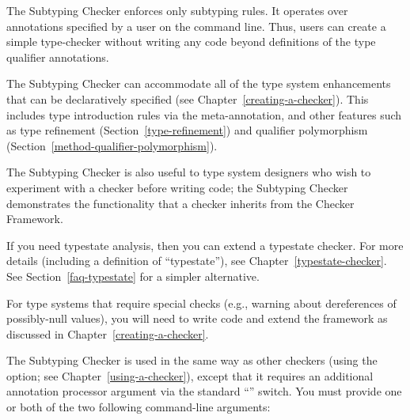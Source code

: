 \htmlhr
{}

The Subtyping Checker enforces only subtyping rules.  It operates over
annotations specified by a user on the command line.  Thus, users can
create a simple type-checker without writing any code beyond definitions of
the type qualifier annotations.

The Subtyping Checker can accommodate all of the type system enhancements that
can be declaratively specified (see Chapter~\ref{creating-a-checker}).
This includes type introduction rules via the
 meta-annotation, and other features such as
type refinement (Section~\ref{type-refinement}) and
qualifier polymorphism (Section~\ref{method-qualifier-polymorphism}).

The Subtyping Checker is also useful to type system designers who wish to
experiment with a checker before writing code; the Subtyping Checker
demonstrates the functionality that a checker inherits from the Checker
Framework.

If you need typestate analysis, then you can extend a typestate checker.
For more details (including a definition of ``typestate''), see
Chapter~\ref{typestate-checker}.
See Section~\ref{faq-typestate} for a simpler alternative.

For type systems that require special checks (e.g., warning about
dereferences of possibly-null values), you will need to write code and
extend the framework as discussed in Chapter~\ref{creating-a-checker}.



\begin{sloppypar}
The Subtyping Checker is used in the same way as other checkers (using the
 option; see Chapter~\ref{using-a-checker}), except that it
requires an additional annotation processor argument via the standard
``'' switch. You must provide one or both of the two following
command-line arguments:
\end{sloppypar}

